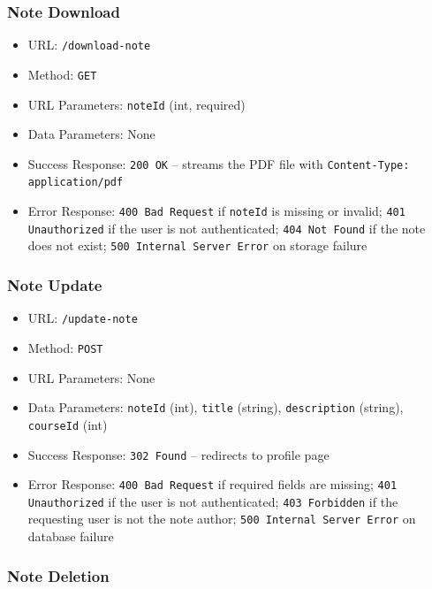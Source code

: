 \subsubsection*{Note Download}

\begin{itemize}
    \item URL: \texttt{/download-note}
    \item Method: \texttt{GET}
    \item URL Parameters: \texttt{noteId} (int, required)
    \item Data Parameters: None
    \item Success Response: \texttt{200 OK} -- streams the PDF file with \texttt{Content-Type: application/pdf}
    \item Error Response: \texttt{400 Bad Request} if \texttt{noteId} is missing or invalid; \texttt{401 Unauthorized} if the user is not authenticated; \texttt{404 Not Found} if the note does not exist; \texttt{500 Internal Server Error} on storage failure
\end{itemize}

\subsubsection*{Note Update}

\begin{itemize}
    \item URL: \texttt{/update-note}
    \item Method: \texttt{POST}
    \item URL Parameters: None
    \item Data Parameters: \texttt{noteId} (int), \texttt{title} (string), \texttt{description} (string), \texttt{courseId} (int)
    \item Success Response: \texttt{302 Found} -- redirects to profile page
    \item Error Response: \texttt{400 Bad Request} if required fields are missing; \texttt{401 Unauthorized} if the user is not authenticated; \texttt{403 Forbidden} if the requesting user is not the note author; \texttt{500 Internal Server Error} on database failure
\end{itemize}

\subsubsection*{Note Deletion}

